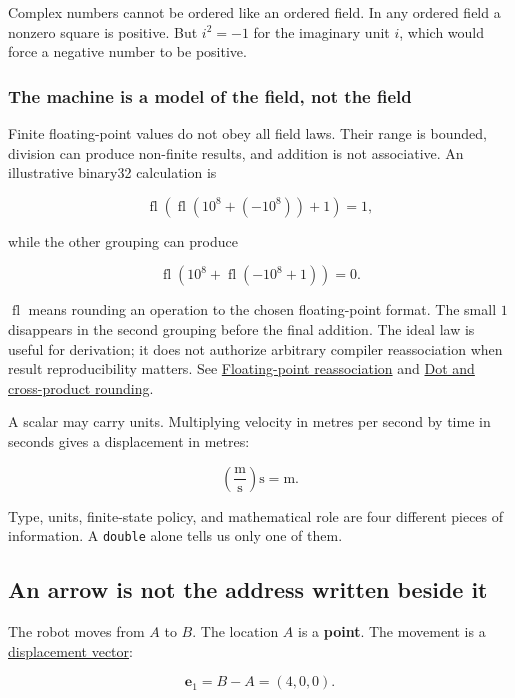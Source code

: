 Complex numbers cannot be ordered like an ordered field. In any ordered field a nonzero square is positive. But \(i^2=-1\) for the imaginary unit \(i\), which would force a negative number to be positive.

\subsubsection{The machine is a model of the field, not the field}\label{the-machine-is-a-model-of-the-field-not-the-field}

Finite floating-point values do not obey all field laws. Their range is bounded, division can produce non-finite results, and addition is not associative. An illustrative binary32 calculation is

\[
\operatorname{fl}\!\left(\operatorname{fl}(10^8+(-10^8))+1\right)=1,
\]

while the other grouping can produce

\[
\operatorname{fl}\!\left(10^8+\operatorname{fl}(-10^8+1)\right)=0.
\]

\(\operatorname{fl}\) means rounding an operation to the chosen floating-point format. The small \(1\) disappears in the second grouping before the final addition. The ideal law is useful for derivation; it does not authorize arbitrary compiler reassociation when result reproducibility matters. See \hyperref[appendix-c2ac4a84c283]{Floating-point reassociation} and \hyperref[appendix-5aef4f13483a]{Dot and cross-product rounding}.

A scalar may carry units. Multiplying velocity in metres per second by time in seconds gives a displacement in metres:

\[
\left(\frac{\mathrm m}{\mathrm s}\right)\mathrm s=\mathrm m.
\]

Type, units, finite-state policy, and mathematical role are four different pieces of information. A \texttt{double} alone tells us only one of them.

\subsection{An arrow is not the address written beside it}\label{an-arrow-is-not-the-address-written-beside-it}

The robot moves from \(A\) to \(B\). The location \(A\) is a \textbf{point}. The movement is a \hyperref[01-foundations-i-ch017]{displacement vector}:

\[
\mathbf e_1=B-A=(4,0,0).
\]

